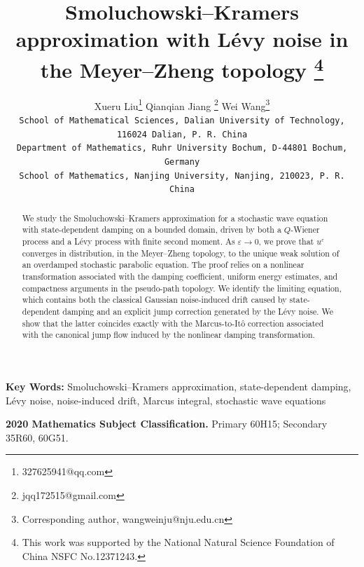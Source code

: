 \documentclass[11pt]{article}
\theoremstyle{plain}
\numberwithin{equation}{section}
\begin{document}
\date{}
\title{\bf Smoluchowski--Kramers approximation with L\'evy noise in the Meyer--Zheng topology  \footnote{This work was supported by
the National Natural Science Foundation of China  NSFC No.12371243.
}}
\author{Xueru Liu\footnote{327625941@qq.com}
\hskip1cm Qianqian Jiang \footnote{jqq172515@gmail.com}
 \hskip1cm Wei Wang\footnote{Corresponding author, wangweinju@nju.edu.cn} \\
\texttt{{\scriptsize School of Mathematical Sciences, Dalian University of Technology, 116024 Dalian, P. R. China}}\\
\texttt{\scriptsize  Department of Mathematics, Ruhr University Bochum, D-44801 Bochum, Germany}\\
\texttt{{\scriptsize School of Mathematics, Nanjing University,
Nanjing, 210023, P. R. China}}\\
}\maketitle

 

\begin{abstract}
We study the Smoluchowski--Kramers approximation for a stochastic wave
equation with state-dependent damping on a bounded domain, driven by both
a \(Q\)-Wiener process and a L\'evy process with finite second moment. 
As \(\varepsilon\to0\), we prove that \(u^\varepsilon\) converges in
distribution, in the Meyer--Zheng topology, to the unique weak solution
of an overdamped stochastic parabolic equation.
The proof relies on a nonlinear transformation associated with the damping
coefficient, uniform energy estimates, and compactness arguments in the
pseudo-path topology. 
We identify the limiting equation, which contains both
the classical Gaussian noise-induced drift caused by state-dependent damping
and an explicit jump correction generated by the L\'evy noise. We show that
the latter coincides exactly with the Marcus-to-It\^o correction associated
with the canonical jump flow induced by the nonlinear damping transformation.
 
\end{abstract}
\maketitle
\noindent\textbf{Key Words:}  {Smoluchowski--Kramers approximation, state-dependent damping, L\'{e}vy noise, noise-induced drift, Marcus integral, stochastic wave equations}\\
\maketitle
\noindent\textbf{2020 Mathematics Subject Classification.}
Primary 60H15; Secondary 35R60, 60G51.
\end{document}
